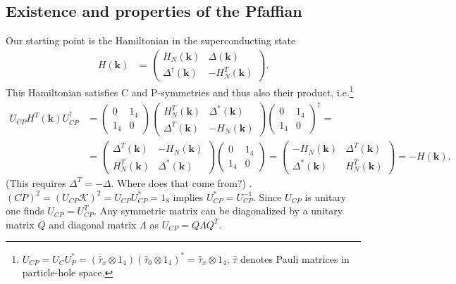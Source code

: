 \documentclass[english, parskip=full]{scrartcl}
\begin{document}
\subsection{Existence and properties of the Pfaffian}
Our starting point is the Hamiltonian in the superconducting state
\begin{align}
H(\textbf{k}) &= \begin{pmatrix}
H_N(\textbf{k}) & \Delta(\textbf{k}) \\ \Delta^\dagger(\textbf{k}) & - H_N^T(\textbf{k})
\end{pmatrix}.
\end{align}
This Hamiltonian satisfies C and P-symmetries and thus also their product, i.e.\footnote{$U_{CP} = U_CU_P^\ast = (\hat{\tau}_x \otimes 1_4) (\hat{\tau}_0 \otimes 1_4)^\ast = \hat{\tau}_x \otimes 1_4$, $\hat{\tau}$ denotes Pauli matrices in particle-hole space.}
\begin{align}
U_{CP} H^T(\textbf{k}) U_{CP}^\dagger &= \begin{pmatrix}
0 & 1_4 \\ 1_4 & 0
\end{pmatrix} \begin{pmatrix}
H_N^T(\textbf{k}) & \Delta^\ast(\textbf{k}) \\ \Delta^T(\textbf{k}) & - H_N(\textbf{k})
\end{pmatrix} \begin{pmatrix}
0 & 1_4 \\ 1_4 & 0
\end{pmatrix}^\dagger = \\
&= \begin{pmatrix}
\Delta^T(\textbf{k}) & - H_N(\textbf{k}) \\
H_N^T(\textbf{k}) & \Delta^\ast(\textbf{k}) 
\end{pmatrix} \begin{pmatrix}
0 & 1_4 \\ 1_4 & 0
\end{pmatrix} = \begin{pmatrix}
-H_N(\textbf{k}) & \Delta^T(\textbf{k}) \\ \Delta^\ast(\textbf{k}) & H_N^T(\textbf{k})
\end{pmatrix} =  - H(\textbf{k}) .
\end{align}
\color{red} (This requires $\Delta^T = -\Delta$. 
Where does that come from?) \color{black}.
$(CP)^2 = (U_{CP}\mathcal{K})^2= U_{CP}U_{CP}^\ast = 1_8$ implies $U_{CP}^\ast = U_{CP}^{-1}$.
Since $U_{CP}$ is unitary one finds $U_{CP}=U_{CP}^T$.
Any symmetric matrix can be diagonalized by a unitary matrix $Q$ and diagonal matrix $\Lambda$ as $U_{CP} = Q\Lambda Q^T$.
\end{document}
